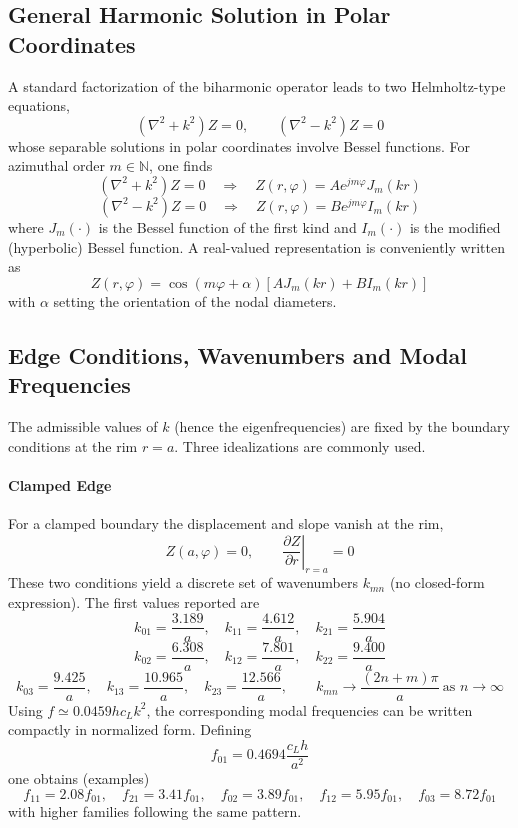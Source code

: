\subsection{General Harmonic Solution in Polar Coordinates}

A standard factorization of the biharmonic operator leads to two Helmholtz-type equations,
\[
(\nabla^{2}+k^{2})Z = 0,
\qquad
(\nabla^{2}-k^{2})Z = 0
\]
whose separable solutions in polar coordinates involve Bessel functions. For azimuthal order \( m\in\mathbb{N} \), one finds
\[
(\nabla^{2}+k^{2})Z = 0
\quad\Rightarrow\quad
Z(r,\varphi) = Ae^{jm\varphi}J_m(kr)
\]
\[
(\nabla^{2}-k^{2})Z = 0
\quad\Rightarrow\quad
Z(r,\varphi) = Be^{jm\varphi}I_m(kr)
\]
where \( J_m(\cdot) \) is the Bessel function of the first kind and \( I_m(\cdot) \) is the modified (hyperbolic) Bessel function. A real-valued representation is conveniently written as
\[
Z(r,\varphi) = \cos(m\varphi+\alpha)\left[AJ_m(kr)+BI_m(kr)\right]
\]
with \( \alpha \) setting the orientation of the nodal diameters.

\subsection{Edge Conditions, Wavenumbers and Modal Frequencies}

The admissible values of \( k \) (hence the eigenfrequencies) are fixed by the boundary conditions at the rim \( r = a \). Three idealizations are commonly used.

\paragraph{Clamped Edge} For a clamped boundary the displacement and slope vanish at the rim,
\[
Z(a,\varphi) = 0,
\qquad
\left.\frac{\partial Z}{\partial r}\right|_{r = a} = 0
\]
These two conditions yield a discrete set of wavenumbers \( k_{mn} \) (no closed-form expression). The first values reported are 
\[
k_{01} = \frac{3.189}{a},\quad
k_{11} = \frac{4.612}{a},\quad
k_{21} = \frac{5.904}{a}
\]
\[
k_{02} = \frac{6.308}{a},\quad
k_{12} = \frac{7.801}{a},\quad
k_{22} = \frac{9.400}{a}
\]
\[
k_{03} = \frac{9.425}{a},\quad
k_{13} = \frac{10.965}{a},\quad
k_{23} = \frac{12.566}{a},
\qquad
k_{mn}\to \frac{(2n+m)\pi}{a}\ \text{as } n\to\infty
\]
Using \( f \simeq 0.0459hc_Lk^2 \), the corresponding modal frequencies can be written compactly in normalized form. Defining
\[
f_{01} = 0.4694\frac{c_L h}{a^{2}}
\]
one obtains (examples)
\[
f_{11} = 2.08f_{01},\quad
f_{21} = 3.41f_{01},\quad
f_{02} = 3.89f_{01},\quad
f_{12} = 5.95f_{01},\quad
f_{03} = 8.72f_{01}
\]
with higher families following the same pattern. 


